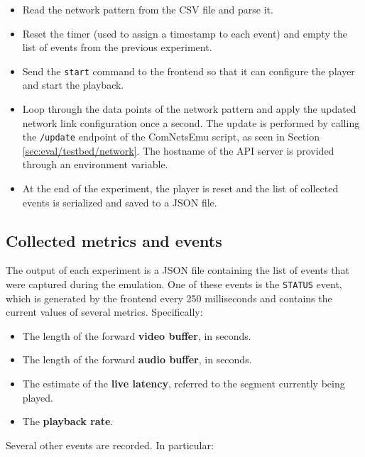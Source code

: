 \begin{itemize}
    \item Read the network pattern from the CSV file and parse it.
    \item Reset the timer (used to assign a timestamp to each event) and empty the list of events from the previous experiment.
    \item Send the \texttt{start} command to the frontend so that it can configure the player and start the playback.
    \item Loop through the data points of the network pattern and apply the updated network link configuration once a second. The update is performed by calling the \texttt{/update} endpoint of the ComNetsEmu script, as seen in Section \ref{sec:eval/testbed/network}. The hostname of the API server is provided through an environment variable.
    \item At the end of the experiment, the player is reset and the list of collected events is serialized and saved to a JSON file.
\end{itemize}

\subsection{Collected metrics and events}
\label{sec:eval/testbed/metrics}

The output of each experiment is a JSON file containing the list of events that were captured during the emulation. One of these events is the \texttt{STATUS} event, which is generated by the frontend every 250 milliseconds and contains the current values of several metrics. Specifically:

\begin{itemize}
    \item The length of the forward \textbf{video buffer}, in seconds.
    \item The length of the forward \textbf{audio buffer}, in seconds.
    \item The estimate of the \textbf{live latency}, referred to the segment currently being played.
    \item The \textbf{playback rate}.
\end{itemize}

Several other events are recorded. In particular:

